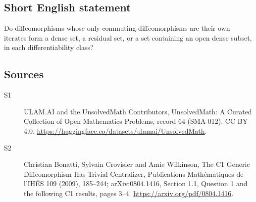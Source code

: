 \documentclass[11pt]{article}
\begin{document}
\subsection{Short English statement}
Do diffeomorphisms whose only commuting diffeomorphisms are their own iterates form a dense set, a residual set, or a set containing an open dense subset, in each differentiability class?
\subsection{Sources}
\begin{description}
\item[\hypertarget{source:64:1}{S1}] ULAM.AI and the UnsolvedMath Contributors, UnsolvedMath: A Curated Collection of Open Mathematics Problems, record 64 (SMA-012). CC BY 4.0. \url{https://huggingface.co/datasets/ulamai/UnsolvedMath}.
\item[\hypertarget{source:64:2}{S2}] Christian Bonatti, Sylvain Crovisier and Amie Wilkinson, The C1 Generic Diffeomorphism Has Trivial Centralizer, Publications Mathématiques de l’IHÉS 109 (2009), 185--244; arXiv:0804.1416, Section 1.1, Question 1 and the following C1 results, pages 3--4. \url{https://arxiv.org/pdf/0804.1416}.
\end{description}
\label{end:64}
\end{document}
